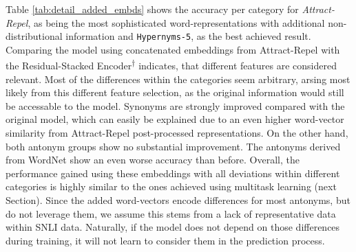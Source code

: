 Table \ref{tab:detail_added_embds} shows the accuracy per category for \textit{Attract-Repel}, as being the most sophisticated word-representations with additional non-distributional information and \texttt{Hypernyms-5}, as the best achieved result. Comparing the model using concatenated embeddings from Attract-Repel with the Residual-Stacked Encoder\textsuperscript{$\dagger$} indicates, that different features are considered relevant. Most of the differences within the categories seem arbitrary, arsing most likely from this different feature selection, as the original information would still be accessable to the model. Synonyms are strongly improved compared with the original model, which can easily be explained due to an even higher word-vector similarity from Attract-Repel post-processed representations. On the other hand, both antonym groups show no substantial improvement. The antonyms derived from WordNet show an even worse accuracy than before. Overall, the performance gained using these embeddings with all deviations within different categories is highly similar to the ones achieved using multitask learning (next Section). Since the added word-vectors encode differences for most antonyms, but do not leverage them, we assume this stems from a lack of representative data within \ac{SNLI} data. Naturally, if the model does not depend on those differences during training, it will not learn to consider them in the prediction process.

